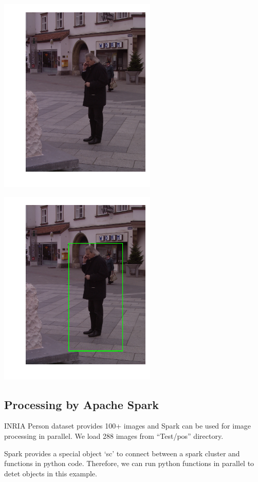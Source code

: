 \includegraphics{facedetection_files/facedetection_62_8.png}

\includegraphics{facedetection_files/facedetection_62_9.png}

\subsection{Processing by Apache
Spark}\label{processing-by-apache-spark}

INRIA Person dataset provides 100+ images and Spark can be used for
image processing in parallel. We load 288 images from ``Test/pos''
directory.

Spark provides a special object `sc' to connect between a spark cluster
and functions in python code. Therefore, we can run python functions in
parallel to detet objects in this example.

